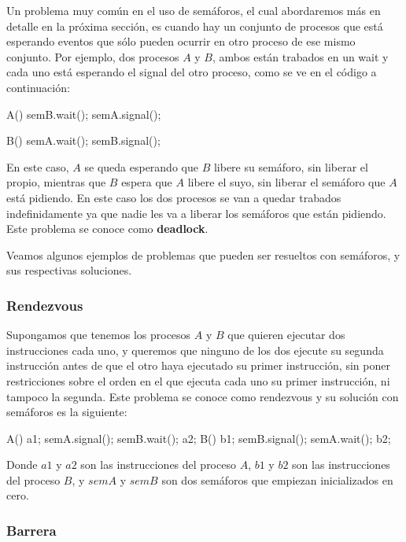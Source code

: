 \documentclass{article}
\begin{document}
Un problema muy com\'un en el uso de sem\'aforos, el cual abordaremos m\'as en detalle en la pr\'oxima secci\'on, es cuando hay un conjunto de procesos que est\'a esperando eventos que s\'olo pueden ocurrir en otro proceso de ese mismo conjunto. Por ejemplo, dos procesos $A$ y $B$, ambos est\'an trabados en un wait y cada uno est\'a esperando el signal del otro proceso, como se ve en el c\'odigo a continuaci\'on:

\begin{code}
A()
{
    semB.wait();
		semA.signal();
}
\end{code}

\begin{code}
B()
{
    semA.wait();
		semB.signal();
}
\end{code}

En este caso, $A$ se queda esperando que $B$ libere su sem\'aforo, sin liberar el propio, mientras que $B$ espera que $A$ libere el suyo, sin liberar el sem\'aforo que $A$ est\'a pidiendo. En este caso los dos procesos se van a quedar trabados indefinidamente ya que nadie les va a liberar los sem\'aforos que est\'an pidiendo. Este problema se conoce como \textbf{deadlock}.

Veamos algunos ejemplos de problemas que pueden ser resueltos con sem\'aforos, y sus respectivas soluciones.

\subsubsection{Rendezvous}

Supongamos que tenemos los procesos $A$ y $B$ que quieren ejecutar dos instrucciones cada uno, y queremos que ninguno de los dos ejecute su segunda instrucci\'on antes de que el otro haya ejecutado su primer instrucci\'on, sin poner restricciones sobre el orden en el que ejecuta cada uno su primer instrucci\'on, ni tampoco la segunda. Este problema se conoce como rendezvous y su soluci\'on con sem\'aforos es la siguiente:

\begin{code}
A()
{
    a1;
		semA.signal();
		semB.wait();
		a2;
}
B()
{
    b1;
		semB.signal();
		semA.wait();
		b2;
}
\end{code}

Donde $a1$ y $a2$ son las instrucciones del proceso $A$, $b1$ y $b2$ son las instrucciones del proceso $B$, y $semA$ y $semB$ son dos sem\'aforos que empiezan inicializados en cero.

\subsubsection{Barrera}
\end{document}
